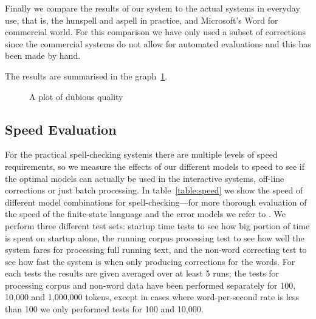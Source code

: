 \documentclass[a4paper,12pt]{article}
\begin{document}
%

Finally we compare the results of our system to the actual systems in everyday
use, that is, the hunspell and aspell in practice, and Microsoft's Word for
commercial world. For this comparison we have only used a subset of corrections
since the commercial systems do not allow for automated evaluations and
this has been made by hand. 

The results are summarised in the graph~\ref{fig:quality}.

\begin{figure}
    \centering
    \caption{A plot of dubious quality
    \label{fig:quality}}
\end{figure}


\subsection{Speed Evaluation}

For the practical spell-checking systems there are multiple levels of speed
requirements, so we measure the effects of our different models to speed to see
if the optimal models can actually be used in the interactive systems, off-line
corrections or just batch processing. In table~\ref{table:speed} we
show the speed of different model combinations for spell-checking---for more
thorough evaluation of the speed of the finite-state language and the error
models we refer to \cite{pirinen2012improving}. We perform three different test
sets: startup time tests to see how big portion of time is spent on startup
alone, the running corpus processing test to see how well the system fares for
processing full running text, and the non-word correcting test to see how fast
the system is when only producing corrections for the words. For each tests
the results are given averaged over at least 5 runs; the tests for processing
corpus and non-word data have been performed separately for 100, 10,000 and
1,000,000 tokens, except in cases where word-per-second rate is less than 100
we only performed tests for 100 and 10,000.
\end{document}
